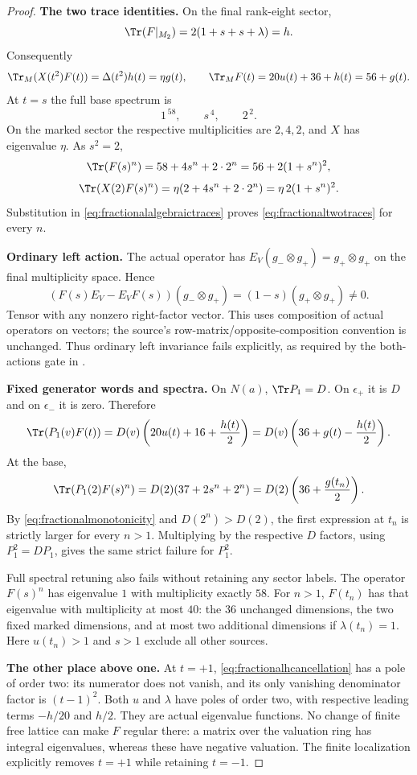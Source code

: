 \begin{proof}
\par\smallskip\noindent\textbf{The two trace identities.}\quad
On the final rank-eight sector,
\[
 \Tr(F|_{M_2})=2(1+s+s+\lambda)=h.
\]
Consequently
\begin{equation}\label{eq:fractionalalgebraictraces}
 \Tr_M(X(t^2)F(t))=\Delta(t^2)h(t)=\eta g(t),\qquad
 \Tr_M F(t)=20u(t)+36+h(t)=56+g(t).
\end{equation}
At $t=s$ the full base spectrum is
\[
 1^{\,58},\qquad s^{\,4},\qquad 2^{\,2}.
\]
On the marked sector the respective multiplicities
are $2,4,2$, and $X$ has eigenvalue $\eta$.
As $s^2=2$,
\[
 \Tr(F(s)^n)=58+4s^n+2\cdot2^n=56+2(1+s^n)^2,
\]
\[
 \Tr(X(2)F(s)^n)
       =\eta(2+4s^n+2\cdot2^n)=\eta\,2(1+s^n)^2.
\]
Substitution in \eqref{eq:fractionalalgebraictraces}
proves \eqref{eq:fractionaltwotraces} for every $n$.

\par\smallskip\noindent\textbf{Ordinary left action.}\quad
The actual  operator has
$E_V(g_-\otimes g_+)=g_+\otimes g_+$ on the final
multiplicity space. Hence
\[
 (F(s)E_V-E_VF(s))(g_-\otimes g_+)
       =(1-s)(g_+\otimes g_+)\ne0.
\]
Tensor with any nonzero right-factor vector.
This uses composition of actual operators on vectors;
the source's row-matrix/opposite-composition convention
is unchanged.
Thus ordinary left invariance fails explicitly, as
required by the both-actions gate in .

\par\smallskip\noindent\textbf{Fixed generator words and spectra.}\quad
On $N(a)$, $\Tr P_1=D$.
On $\epsilon_+$ it is $D$ and on $\epsilon_-$ it is zero.
Therefore
\[
 \Tr(P_1(v)F(t))
 =D(v)\left(20u(t)+16+\frac{h(t)}2\right)
 =D(v)\left(36+g(t)-\frac{h(t)}2\right).
\]
At the base,
\[
 \Tr(P_1(2)F(s)^n)
  =D(2)(37+2s^n+2^n)
  =D(2)\left(36+\frac{g(t_n)}2\right).
\]
By \eqref{eq:fractionalmonotonicity} and
$D(2^n)>D(2)$, the first expression at $t_n$
is strictly larger for every $n>1$.
Multiplying by the respective $D$ factors, using
$P_1^2=DP_1$, gives the same strict failure for $P_1^2$.

Full spectral retuning also fails without retaining
any sector labels. The operator $F(s)^n$ has eigenvalue
$1$ with multiplicity exactly $58$.
For $n>1$, $F(t_n)$ has that eigenvalue with multiplicity
at most $40$: the $36$ unchanged dimensions, the two
fixed marked dimensions, and at most two additional
dimensions if $\lambda(t_n)=1$.
Here $u(t_n)>1$ and $s>1$ exclude all other sources.

\par\smallskip\noindent\textbf{The other place above one.}\quad
At $t=+1$, \eqref{eq:fractionalhcancellation} has a pole
of order two: its numerator does not vanish, and its
only vanishing denominator factor is $(t-1)^2$.
Both $u$ and $\lambda$ have poles of order two, with
respective leading terms $-h/20$ and $h/2$.
They are actual eigenvalue functions.
No change of finite free lattice can make $F$ regular
there: a matrix over the valuation ring has integral
eigenvalues, whereas these have negative valuation.
The finite localization explicitly removes $t=+1$
while retaining $t=-1$.
\end{proof}

